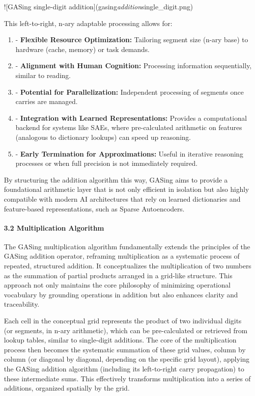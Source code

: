 ![GASing single-digit addition](gasing\emph{addition}single_digit.png)


This left-to-right, n-ary adaptable processing allows for:
\begin{enumerate}
  \item - \textbf{Flexible Resource Optimization:} Tailoring segment size (n-ary base) to hardware (cache, memory) or task demands.
  \item - \textbf{Alignment with Human Cognition:} Processing information sequentially, similar to reading.
  \item - \textbf{Potential for Parallelization:} Independent processing of segments once carries are managed.
  \item - \textbf{Integration with Learned Representations:} Provides a computational backend for systems like SAEs, where pre-calculated arithmetic on features (analogous to dictionary lookups) can speed up reasoning.
  \item - \textbf{Early Termination for Approximations:} Useful in iterative reasoning processes or when full precision is not immediately required.
\end{enumerate}

By structuring the addition algorithm this way, GASing aims to provide a foundational arithmetic layer that is not only efficient in isolation but also highly compatible with modern AI architectures that rely on learned dictionaries and feature-based representations, such as Sparse Autoencoders.

\paragraph{3.2 Multiplication Algorithm}
The GASing multiplication algorithm fundamentally extends the principles of the GASing addition operator, reframing multiplication as a systematic process of repeated, structured addition. It conceptualizes the multiplication of two numbers as the summation of partial products arranged in a grid-like structure. This approach not only maintains the core philosophy of minimizing operational vocabulary by grounding operations in addition but also enhances clarity and traceability.

Each cell in the conceptual grid represents the product of two individual digits (or segments, in n-ary arithmetic), which can be pre-calculated or retrieved from lookup tables, similar to single-digit additions. The core of the multiplication process then becomes the systematic summation of these grid values, column by column (or diagonal by diagonal, depending on the specific grid layout), applying the GASing addition algorithm (including its left-to-right carry propagation) to these intermediate sums. This effectively transforms multiplication into a series of additions, organized spatially by the grid.

